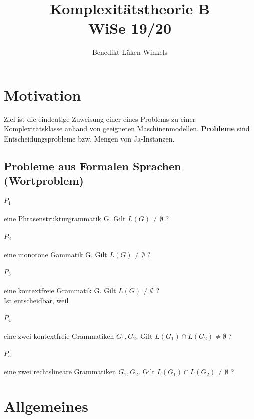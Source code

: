 \documentclass[ngerman]{scrartcl}
\title{Komplexitätstheorie B \\ WiSe 19/20}
\author{Benedikt Lüken-Winkels}
\begin{document}
\maketitle
\tableofcontents
\newpage

\section{Motivation}
Ziel ist die eindeutige Zuweisung einer eines Problems zu einer Komplexitätsklasse anhand von geeigneten Maschinenmodellen. \textbf{Probleme} sind Entscheidungsprobleme bzw. Mengen von Ja-Instanzen. 

\subsection{Probleme aus Formalen Sprachen (Wortproblem)}
\paragraph{$ P_1 $} eine Phrasenstrukturgrammatik G. Gilt $ L(G) \neq \emptyset $ ? 


\paragraph{$ P_2 $} eine monotone Gammatik G. Gilt $ L(G) \neq \emptyset $ ? 


\paragraph{$ P_3 $} eine kontextfreie Grammatik G. Gilt $ L(G) \neq \emptyset $ ? \\
Ist entscheidbar, weil

\paragraph{$ P_4 $} eine zwei kontextfreie Grammatiken $ G_1, G_2 $. Gilt $ L(G_1) \cap L(G_2) \neq \emptyset $ ? 


\paragraph{$ P_5 $} eine zwei rechtslineare Grammatiken $ G_1, G_2 $. Gilt $ L(G_1) \cap L(G_2) \neq \emptyset $ ?  




\section{Allgemeines}
\end{document}
